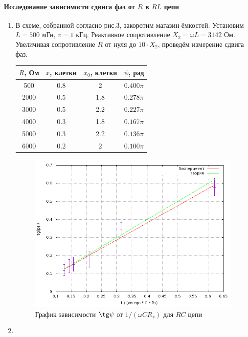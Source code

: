 \documentclass[12pt]{article}
\begin{document}
\paragraph{Исследование зависимости сдвига фаз от $R$ в $RL$ цепи}
\begin{enumerate}
	\item
		В схеме, собранной согласно рис.3, закоротим магазин ёмкостей. Установим $L = 500$ мГн, $v = 1$ кГц. Реактивное сопротивление $X_2 = \omega L = 3142$ Ом. Увеличивая сопротивление $R$ от нуля до $10 \cdot X_2$, проведём измерение сдвига фаз.
		\begin{table}[h!]
		\centering
		\begin{tabular}{|c|c|c|c|}
			\hline
			$R$, Ом  &  $x$, клетки & $x_0$, клетки & $\psi$, рад \\
 			\hline
 			500 & 0.8 & 2 & $0.400 \pi$\\
 			\hline
 			2000 & 0.5 & 1.8 & $0.278 \pi$  \\
 			\hline
 			3000 & 0.5 & 2.2 & $0.227 \pi$\\
 			\hline
 		    4000 & 0.3 & 1.8 & $0.167 \pi$\\
 			\hline
 			5000 & 0.3 & 2.2 & $0.136 \pi$\\ 						
			\hline
			6000 & 0.2 & 2 & $0.100 \pi$\\
			\hline
			\end{tabular}
		\label{table3}
		\end{table}		
		\newpage 		
		\begin{figure}[h!]
			\centering
			\includegraphics[width = 15cm,height = 8cm]{plot1.png}
			\caption{График зависимости $\tg \psi$ от $ 1 / \left(\omega C R_s \right)$ для $RC$ цепи}
			\label{plot1}
		\end{figure}
	\item	

\end{enumerate}
\end{document}
